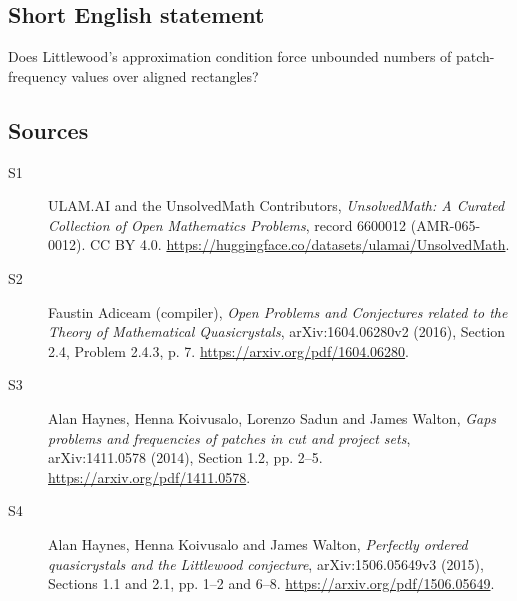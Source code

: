 \documentclass[11pt]{article}
\begin{document}
\subsection{Short English statement}
Does Littlewood’s approximation condition force unbounded numbers of patch-frequency values over aligned rectangles?
\subsection{Sources}
\begin{description}
\item[\hypertarget{source:6600012:1}{S1}] ULAM.AI and the UnsolvedMath Contributors, \emph{UnsolvedMath: A Curated Collection of Open Mathematics Problems}, record 6600012 (AMR-065-0012). CC BY 4.0. \url{https://huggingface.co/datasets/ulamai/UnsolvedMath}.
\item[\hypertarget{source:6600012:2}{S2}] Faustin Adiceam (compiler), \emph{Open Problems and Conjectures related to the Theory of Mathematical Quasicrystals}, arXiv:1604.06280v2 (2016), Section 2.4, Problem 2.4.3, p. 7. \url{https://arxiv.org/pdf/1604.06280}.
\item[\hypertarget{source:6600012:3}{S3}] Alan Haynes, Henna Koivusalo, Lorenzo Sadun and James Walton, \emph{Gaps problems and frequencies of patches in cut and project sets}, arXiv:1411.0578 (2014), Section 1.2, pp. 2--5. \url{https://arxiv.org/pdf/1411.0578}.
\item[\hypertarget{source:6600012:4}{S4}] Alan Haynes, Henna Koivusalo and James Walton, \emph{Perfectly ordered quasicrystals and the Littlewood conjecture}, arXiv:1506.05649v3 (2015), Sections 1.1 and 2.1, pp. 1--2 and 6--8. \url{https://arxiv.org/pdf/1506.05649}.
\end{description}
\label{end:6600012}
\end{document}
